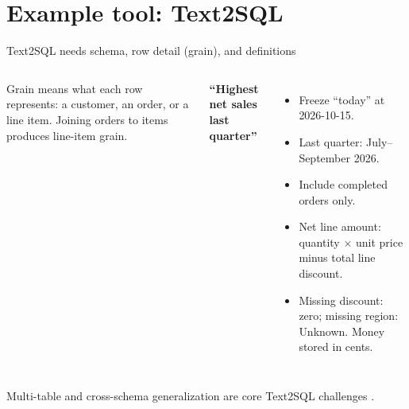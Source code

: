 \documentclass[aspectratio=169]{beamer}
\newcommand{\visualdescription}[1]{\par\vspace{.2em}\noindent\parbox{\linewidth}{\centering\tiny\color{sourcegray}#1}}
\begin{document}
\section{Example tool: Text2SQL}
\begin{frame}{Text2SQL needs schema, row detail (grain), and definitions}
\small
\begin{columns}[c]
\centering
{}
\visualdescription{Grain means what each row represents: a customer, an order, or a line item. Joining orders to items produces line-item grain.}
\textbf{``Highest net sales last quarter''}
\begin{itemize}\itemsep.35em
\item Freeze ``today'' at 2026-10-15.
\item Last quarter: July--September 2026.
\item Include completed orders only.
\item Net line amount: quantity $\times$ unit price minus total line discount.
\item Missing discount: zero; missing region: Unknown. Money stored in cents.
\end{itemize}
\end{columns}
\par\smallskip\footnotesize Multi-table and cross-schema generalization are core Text2SQL challenges \parencite{Yu2018Spider}.
\end{frame}
\end{document}
